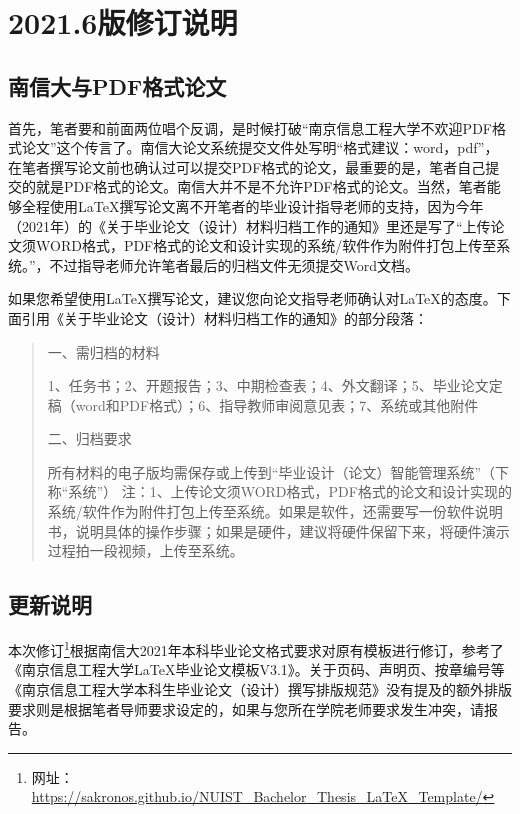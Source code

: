 \section{2021.6版修订说明}

\subsection{南信大与PDF格式论文}
首先，笔者要和前面两位唱个反调，是时候打破“南京信息工程大学不欢迎PDF格式论文”这个传言了。南信大论文系统提交文件处写明“格式建议：word，pdf”，在笔者撰写论文前也确认过可以提交PDF格式的论文，最重要的是，笔者自己提交的就是PDF格式的论文。南信大并不是不允许PDF格式的论文。当然，笔者能够全程使用\LaTeX 撰写论文离不开笔者的毕业设计指导老师的支持，因为今年（2021年）的《关于毕业论文（设计）材料归档工作的通知》里还是写了“上传论文须WORD格式，PDF格式的论文和设计实现的系统/软件作为附件打包上传至系统。”，不过指导老师允许笔者最后的归档文件无须提交Word文档。

如果您希望使用\LaTeX 撰写论文，建议您向论文指导老师确认对\LaTeX 的态度。下面引用《关于毕业论文（设计）材料归档工作的通知》的部分段落：
\begin{quote}
一、需归档的材料

1、任务书；2、开题报告；3、中期检查表；4、外文翻译；5、毕业论文定稿（word和PDF格式）；6、指导教师审阅意见表；7、系统或其他附件

二、归档要求

所有材料的电子版均需保存或上传到“毕业设计（论文）智能管理系统”（下称“系统”）
注：1、上传论文须WORD格式，PDF格式的论文和设计实现的系统/软件作为附件打包上传至系统。如果是软件，还需要写一份软件说明书，说明具体的操作步骤；如果是硬件，建议将硬件保留下来，将硬件演示过程拍一段视频，上传至系统。

\end{quote}

\subsection{更新说明}
本次修订\footnote{网址：\url{https://sakronos.github.io/NUIST_Bachelor_Thesis_LaTeX_Template/}}根据南信大2021年本科毕业论文格式要求对原有模板进行修订，参考了《南京信息工程大学LaTeX毕业论文模板V3.1》\cite{geiNanJingXinXiGongChengDaXueLaTeXBiYeLunWenMoBanV31GengXinWuXuYiLaiCTeXRuanJian2021}。关于页码、声明页、按章编号等《南京信息工程大学本科生毕业论文（设计）撰写排版规范》没有提及的额外排版要求则是根据笔者导师要求设定的，如果与您所在学院老师要求发生冲突，请报告。

